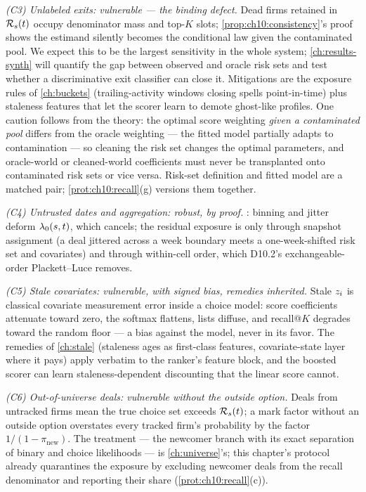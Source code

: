 \emph{(C3) Unlabeled exits: vulnerable --- the binding defect.} Dead
firms retained in $\mathcal{R}_s(t)$ occupy denominator mass and top-$K$
slots; \cref{prop:ch10:consistency}'s proof shows the estimand silently
becomes the conditional law given the contaminated pool. We expect this
to be the largest sensitivity in the whole system;
\cref{ch:results-synth} will quantify the gap between observed and
oracle risk sets and test whether a discriminative exit classifier can
close it. Mitigations are the exposure rules of \cref{ch:buckets}
(trailing-activity windows closing spells point-in-time) plus staleness
features that let the scorer learn to demote ghost-like profiles. One
caution follows from the theory: the optimal score weighting
\emph{given a contaminated pool} differs from the oracle weighting ---
the fitted model partially adapts to contamination --- so cleaning the
risk set changes the optimal parameters, and oracle-world or
cleaned-world coefficients must never be transplanted onto contaminated
risk sets or vice versa. Risk-set definition and fitted model are a
matched pair; \cref{prot:ch10:recall}(g) versions them together.

\emph{(C4) Untrusted dates and aggregation: robust, by proof.}
: binning and jitter deform $\lambda_0(s,t)$, which
cancels; the residual exposure is only through snapshot assignment
(a deal jittered across a week boundary meets a one-week-shifted risk set
and covariates) and through within-cell order, which D10.2's
exchangeable-order Plackett--Luce removes.

\emph{(C5) Stale covariates: vulnerable, with signed bias, remedies
inherited.} Stale $z_i$ is classical covariate measurement error
inside a choice model: score coefficients attenuate toward zero, the
softmax flattens, lists diffuse, and recall@$K$ degrades toward the
random floor --- a bias against the model, never in its favor. The
remedies of \cref{ch:stale} (staleness ages as first-class features,
covariate-state layer where it pays) apply verbatim to the ranker's
feature block, and the boosted scorer can learn staleness-dependent
discounting that the linear score cannot.

\emph{(C6) Out-of-universe deals: vulnerable without the outside option.}
Deals from untracked firms mean the true choice set exceeds
$\mathcal{R}_s(t)$; a mark factor without an outside option overstates every
tracked firm's probability by the factor $1/(1 - \pi_{\mathrm{new}})$.
The treatment --- the newcomer branch with its exact separation of binary
and choice likelihoods --- is \cref{ch:universe}'s; this chapter's
protocol already quarantines the exposure by excluding newcomer deals
from the recall denominator and reporting their share
(\cref{prot:ch10:recall}(c)).

